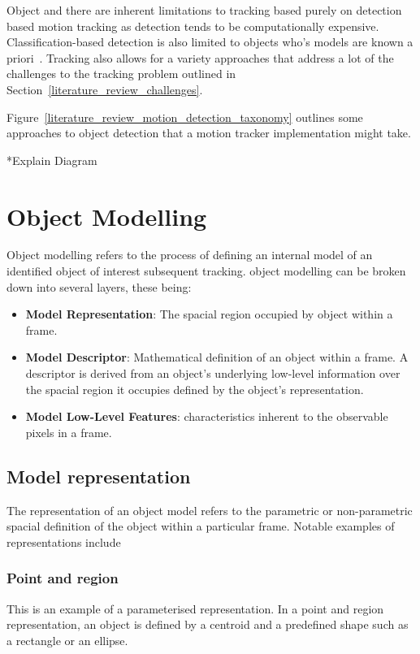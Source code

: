 Object and there are inherent limitations to tracking based purely on
detection based motion tracking as detection tends to be computationally
expensive. Classification-based detection is also limited to objects who's
models are known a priori~\cite{Forsyth2012}.
Tracking also allows for a variety approaches that address a lot of the
challenges to the tracking problem outlined in
Section~\ref{literature_review_challenges}.

Figure~\ref{literature_review_motion_detection_taxonomy} outlines some
approaches to object detection that a motion tracker implementation might take.


*Explain Diagram

\section{Object Modelling}\label{literature_review_object_modelling}
Object modelling refers to the process of defining an internal model of
an identified object of interest subsequent tracking. object modelling can be
broken down into several layers, these being:

\begin{itemize}
    \item \textbf{Model Representation}: The spacial region occupied by object within a
        frame.
    \item \textbf{Model Descriptor}: Mathematical definition of an object within
        a frame. A descriptor is derived from an object's underlying low-level information over the spacial
        region it occupies defined by the object's representation.
    \item \textbf{Model Low-Level Features}: characteristics inherent to the
        observable pixels in a frame.
\end{itemize}

\subsection{Model representation}
The representation of an object model refers to the parametric or non-parametric
spacial definition of the object within a particular frame. Notable examples of
representations include

\subsubsection{Point and region}
This is an example of a parameterised representation. In a point and region
representation, an object is defined by a centroid and a predefined shape such
as a rectangle or an ellipse.

